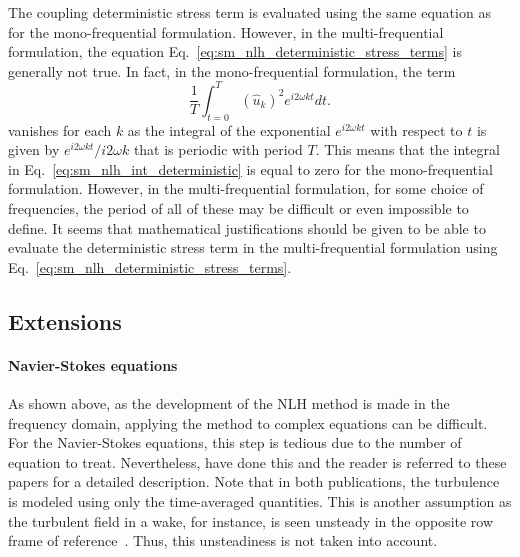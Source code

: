 The coupling deterministic stress term is evaluated using the
same equation as for the mono-frequential formulation.
However, in the multi-frequential formulation, 
the equation Eq.~\eqref{eq:sm_nlh_deterministic_stress_terms}
is generally not true.
In fact, in the mono-frequential formulation, the term
\begin{equation}
	\frac{1}{T} \int_{t=0}^{T} (\widehat{u}_k)^2
		e^{i 2 \omega k t} dt.
	\label{eq:sm_nlh_int_deterministic}
\end{equation}
vanishes for each $k$ as the integral of the
exponential $e^{i 2 \omega k t}$ with respect to $t$
is given by $e^{i 2 \omega k t} / i 2 \omega k$ that is
periodic with period $T$. This means that the integral in 
Eq.~\eqref{eq:sm_nlh_int_deterministic} is equal to zero
for the mono-frequential formulation. 
However, in the multi-frequential
formulation, for some choice of frequencies, the period of all
of these may be difficult or even impossible to define. It
seems that mathematical justifications should be given
to be able to evaluate the deterministic stress term 
in the multi-frequential formulation
using Eq.~\eqref{eq:sm_nlh_deterministic_stress_terms}.

\subsection{Extensions}

\paragraph{Navier-Stokes equations}
As shown above, as the development of the NLH
method is made in the frequency domain, applying the method to
complex equations can be difficult. For the Navier-Stokes equations,
this step is tedious due to the number of equation to treat. Nevertheless, 
\citet{He1998, Chen2001, He2002, Vilmin2006} have
done this and the reader is referred to these papers
for a detailed description.
Note that in both publications, the turbulence is modeled
using only the time-averaged quantities.
This is another assumption as the turbulent field in a wake,
for instance, is seen unsteady in the opposite row frame
of reference~\cite{Lakshminarayana1980}. Thus, this
unsteadiness is not taken into account.

